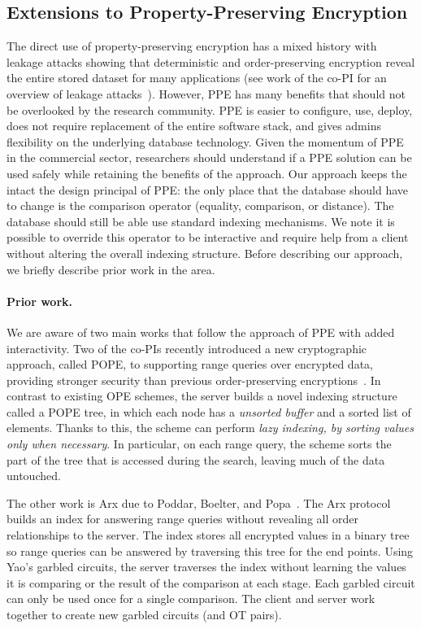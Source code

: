 
\subsection{Extensions to Property-Preserving Encryption}
The direct use of property-preserving encryption has a mixed history with leakage attacks showing that deterministic and order-preserving encryption reveal the entire stored dataset for many applications (see work of the co-PI for an overview of leakage attacks~\cite{SP:FVYSHG17}).  However, PPE has many benefits that should not be overlooked by the research community.  PPE is easier to configure, use, deploy, does not require replacement of the entire software stack, and gives admins flexibility on the underlying database technology.  Given the momentum of PPE in the commercial sector, researchers should understand if a PPE solution can be used safely while retaining the benefits of the approach.  Our approach keeps the intact the design principal of PPE: the only place that the database should have to change is the comparison operator (equality, comparison, or distance).  The database should still be able use standard indexing mechanisms.  We note it is possible to override this operator to be interactive and require help from a client without altering the overall indexing structure.  Before describing our approach, we briefly describe prior work in the area.

\paragraph{Prior work.}
We are aware of two main works that follow the approach of PPE with added interactivity.  Two of the co-PIs recently introduced a new cryptographic approach, called POPE, to
supporting range queries over encrypted data, providing stronger security than
previous order-preserving encryptions~\cite{CCS:RACY16}.  In contrast to
existing OPE schemes, the server builds a novel indexing structure called a
POPE tree, in which each node has a {\it unsorted buffer} and a sorted list of
elements.  Thanks to this, the scheme can perform {\it lazy indexing, by
sorting values only when necessary}. In particular, on each range query, the
scheme sorts the part of the tree that is accessed during the search, leaving
much of the data untouched.

The other work is Arx due to Poddar, Boelter, and Popa~\cite{EPRINT:PodBoePop16}.  The
Arx protocol builds an index for answering
range queries without revealing all order relationships to the
server. The index stores all encrypted values in a binary
tree so range queries can be answered by traversing this
tree for the end points. Using Yao's garbled circuits, the
server traverses the index without learning the values it is
comparing or the result of the comparison at each stage.  Each garbled circuit can only be used once for a single comparison.  The client and server work together to create new garbled circuits (and OT pairs).

